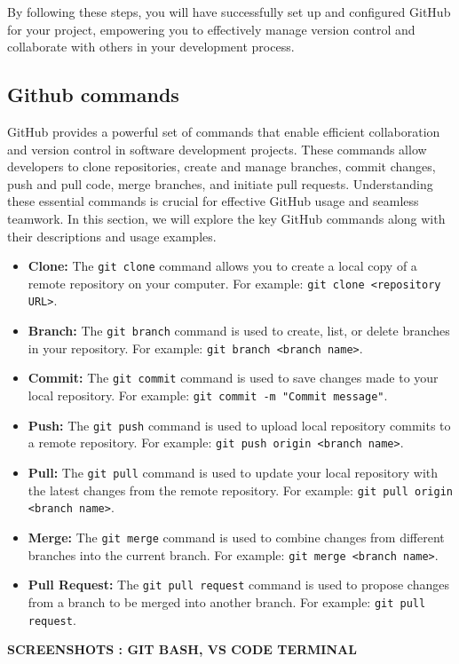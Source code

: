 By following these steps, you will have successfully set up and configured GitHub for your project, empowering you to effectively manage version control and collaborate with others in your development process.

\subsection{Github commands}
GitHub provides a powerful set of commands that enable efficient collaboration and version control in software development projects. These commands allow developers to clone repositories, create and manage branches, commit changes, push and pull code, merge branches, and initiate pull requests. Understanding these essential commands is crucial for effective GitHub usage and seamless teamwork. In this section, we will explore the key GitHub commands along with their descriptions and usage examples.

\medskip \begin{itemize}
    \item \textbf{Clone:} The \texttt{git clone} command allows you to create a local copy of a remote repository on your computer. For example: \texttt{git clone <repository URL>}.
  
    \item \textbf{Branch:} The \texttt{git branch} command is used to create, list, or delete branches in your repository. For example: \texttt{git branch <branch name>}.
  
    \item \textbf{Commit:} The \texttt{git commit} command is used to save changes made to your local repository. For example: \texttt{git commit -m "Commit message"}.
  
    \item \textbf{Push:} The \texttt{git push} command is used to upload local repository commits to a remote repository. For example: \texttt{git push origin <branch name>}.
  
    \item \textbf{Pull:} The \texttt{git pull} command is used to update your local repository with the latest changes from the remote repository. For example: \texttt{git pull origin <branch name>}.
  
    \item \textbf{Merge:} The \texttt{git merge} command is used to combine changes from different branches into the current branch. For example: \texttt{git merge <branch name>}.
  
    \item \textbf{Pull Request:} The \texttt{git pull request} command is used to propose changes from a branch to be merged into another branch. For example: \texttt{git pull request}.
  \end{itemize}
  \medskip \textbf{SCREENSHOTS : GIT BASH, VS CODE TERMINAL }

